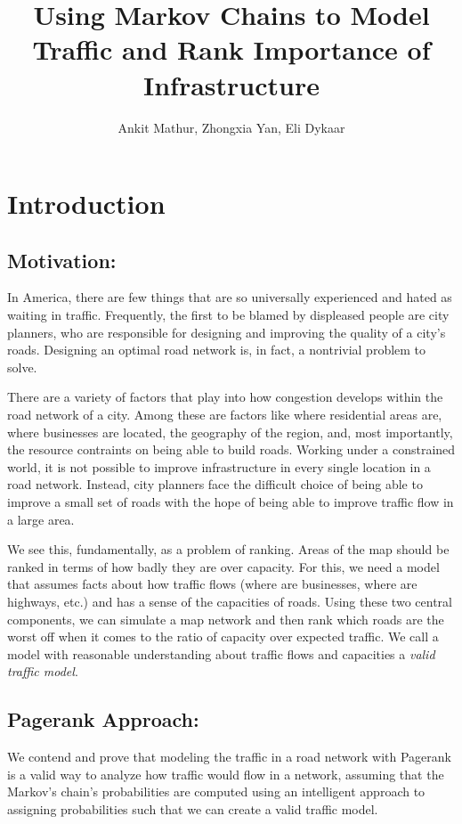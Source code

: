 \documentclass{article}
\begin{document}
\title{Using Markov Chains to Model Traffic and Rank Importance of Infrastructure}
\author{Ankit Mathur, Zhongxia Yan, Eli Dykaar}
\maketitle
\section{Introduction}
\subsection{Motivation:}
In America, there are few things that are so universally experienced and hated as waiting in traffic. Frequently, the first to be blamed by displeased people are city planners, who are responsible for designing and improving the quality of a city's roads. Designing an optimal road network is, in fact, a nontrivial problem to solve. 

There are a variety of factors that play into how congestion develops within the road network of a city. Among these are factors like where residential areas are, where businesses are located, the geography of the region, and, most importantly, the resource contraints on being able to build roads. Working under a constrained world, it is not possible to improve infrastructure in every single location in a road network. Instead, city planners face the difficult choice of being able to improve a small set of roads with the hope of being able to improve traffic flow in a large area. 

We see this, fundamentally, as a problem of ranking. Areas of the map should be ranked in terms of how badly they are over capacity. For this, we need a model that assumes facts about how traffic flows (where are businesses, where are highways, etc.) and has a sense of the capacities of roads. Using these two central components, we can simulate a map network and then rank which roads are the worst off when it comes to the ratio of capacity over expected traffic. We call a model with reasonable understanding about traffic flows and capacities a \emph{valid traffic model}.
\subsection{Pagerank Approach:}
We contend and prove that modeling the traffic in a road network with Pagerank is a valid way to analyze how traffic would flow in a network, assuming that the Markov's chain's probabilities are computed using an intelligent approach to assigning probabilities such that we can create a valid traffic model. 
\end{document}

